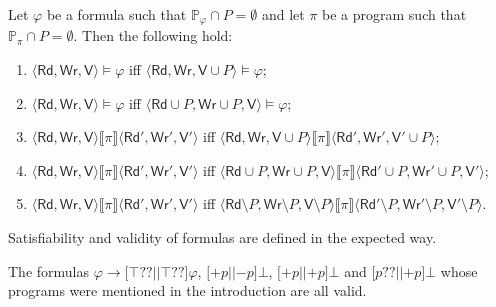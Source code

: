 \documentclass{llncs}
\newcommand{\modl}{\mathsf m}
\newcommand{\pll}{ {||} }							%
\newcommand{\readset}{\mathsf{Rd}}
\newcommand{\valuset}{\mathsf{V}}
\newcommand{\writeset}{\mathsf{Wr}}
\newcommand{\testendo}{?\!\!?}			%
\newcommand{\assgntopV}[1]{{\mathtt {+} #1}}
\newcommand{\assgnbotV}[1]{{\mathtt {-} #1}}
\newcommand{\intPgm}[1]{\llbracket #1 \rrbracket}
\newcommand{\lbox}[1]{ \big[ #1 \big] }
\newcommand{\limp}{ \rightarrow }
\renewcommand{\phi}{\varphi}
\newcommand{\propset}{\mathbb P}
\newcommand{\propsetOf}[1]{\propset_{#1}}
\newcommand{\tuple}[1]{ \langle #1 \rangle}
\begin{document}
\begin{lemma}\label{theo:irrelevantVariables}
Let $\phi$ be a formula such that $\propsetOf \phi \cap P = \emptyset$ and
let $ \pi$ be a program such that $\propsetOf \pi \cap P = \emptyset$. Then the following hold:
\begin{enumerate}
\item
$\tuple{\readset,\writeset,\valuset} \models \phi $ iff
$\tuple{\readset,\writeset,\valuset\cup P} \models \phi$;
\item
$\tuple{\readset,\writeset,\valuset} \models \phi $ iff
$\tuple{\readset\cup P,\writeset\cup P,\valuset} \models \phi$;
\item
$\tuple{\readset,\writeset,\valuset} \intPgm \pi \tuple{\readset',\writeset',\valuset'} $ iff
$\tuple{\readset,\writeset,\valuset\cup P} \intPgm \pi \tuple{\readset',\writeset',\valuset'\cup P} $;
\item
$\tuple{\readset,\writeset,\valuset} \intPgm \pi \tuple{\readset',\writeset',\valuset'} $ iff
$\tuple{\readset\cup P,\writeset\cup P,\valuset} \intPgm \pi \tuple{\readset'\cup P,\writeset'\cup P,\valuset'} $;
\item
$\tuple{\readset,\writeset,\valuset} \intPgm \pi \tuple{\readset',\writeset',\valuset'} $ iff
$\tuple{\readset\setminus P,\writeset\setminus P,\valuset\setminus P} \intPgm \pi \tuple{\readset'\setminus P,\writeset'\setminus P,\valuset'\setminus P} $.
\end{enumerate}
\end{lemma}

Satisfiability and validity of formulas are defined in the expected way.

\begin{example}
The formulas 
$\phi \limp \lbox{ \top \testendo \pll \top \testendo } \phi$, 
$\lbox{ \assgntopV p \pll \assgnbotV p } \bot$,
$\lbox{ \assgntopV p \pll \assgntopV p } \bot$ and 
$\lbox{ p \testendo \pll \assgntopV p } \bot$ 
whose programs were mentioned in the introduction are all valid. 
\end{example}

%
\end{document}
